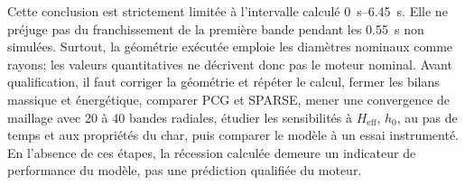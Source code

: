 \documentclass[oneside,openany]{amsdtx}
\begin{document}
Cette conclusion est strictement limitée à l'intervalle calculé
\SIrange{0}{6.45}{s}. Elle ne préjuge pas du franchissement de la première
bande pendant les \SI{0.55}{s} non simulées. Surtout, la géométrie exécutée
emploie les diamètres nominaux comme rayons; les valeurs quantitatives ne
décrivent donc pas le moteur nominal. Avant qualification, il faut corriger la
géométrie et répéter le calcul, fermer les bilans massique et énergétique,
comparer PCG et SPARSE, mener une convergence de maillage avec 20 à 40 bandes
radiales, étudier les sensibilités à \(H_\mathrm{eff}\), \(h_0\), au pas de
temps et aux propriétés du char, puis comparer le modèle à un essai
instrumenté. En l'absence de ces étapes, la récession calculée demeure un
indicateur de performance du modèle, pas une prédiction qualifiée du moteur.

\clearpage
\end{document}
